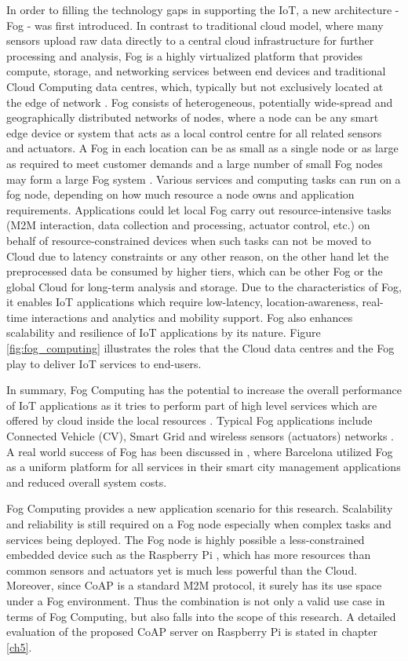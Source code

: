In order to filling the technology gaps in supporting the IoT, a new architecture - Fog - was first introduced. In contrast to traditional cloud model, where many sensors upload raw data directly to a central cloud infrastructure for further processing and analysis, Fog is a highly virtualized platform that provides compute, storage, and networking services between end devices and traditional Cloud Computing data centres, which, typically but not exclusively located at the edge of network \cite{Bonomi:2012:FCR:2342509.2342513}.  Fog consists of heterogeneous, potentially wide-spread and geographically distributed networks of nodes, where a node can be any smart edge device or system that acts as a local control centre for all related sensors and actuators. A Fog in each location can be as small as a single node or as large as required to meet customer demands and a large number of small Fog nodes may form a large Fog system \cite{7498684}. Various services and computing tasks can run on a fog node, depending on how much resource a node owns and application requirements. Applications could let local Fog carry out resource-intensive tasks (M2M interaction, data collection and processing, actuator control, etc.) on behalf of resource-constrained devices when such tasks can not be moved to Cloud due to latency constraints or any other reason, on the other hand let the preprocessed data be consumed by higher tiers, which can be other Fog or the global Cloud for long-term analysis and storage. Due to the characteristics of Fog, it enables IoT applications which require low-latency, location-awareness, real-time interactions and analytics and mobility support. Fog also enhances scalability and resilience of IoT applications by its nature. Figure \ref{fig:fog_computing} illustrates the roles that the Cloud data centres and the Fog play to deliver IoT services to end-users. 

In summary, Fog Computing has the potential to increase the overall performance of IoT applications as it tries to perform part of high level services which are offered by cloud inside the local resources \cite{7123563}. Typical Fog applications include Connected Vehicle (CV), Smart Grid and wireless sensors (actuators) networks \cite{Bonomi:2012:FCR:2342509.2342513}. A real world success of Fog has been discussed in \cite{7498684}, where Barcelona utilized Fog as a uniform platform for all services in their smart city management applications and reduced overall system costs.

Fog Computing provides a new application scenario for this research. Scalability and reliability is still required on a Fog node especially when complex tasks and services being deployed. The Fog node is highly possible a less-constrained embedded device such as the Raspberry Pi \cite{raspberry_pi}, which has more resources than common sensors and actuators yet is much less powerful than the Cloud. Moreover,  since CoAP is a standard M2M protocol, it surely has its use space under a Fog environment. Thus the combination is not only a valid use case in terms of Fog Computing, but also falls into the scope of this research. A detailed evaluation of the proposed CoAP server on Raspberry Pi is stated in chapter \ref{ch5}.


